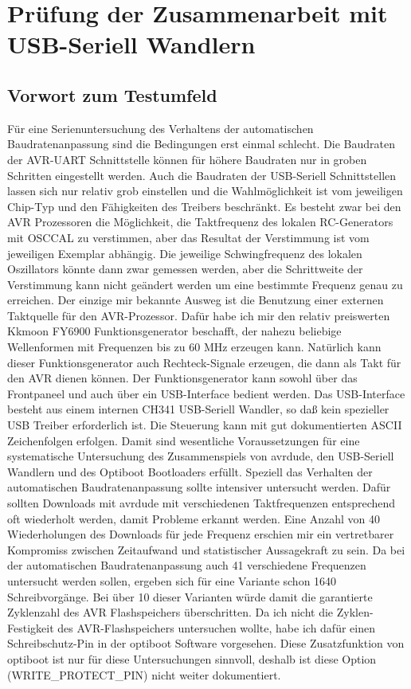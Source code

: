 \section{Prüfung der Zusammenarbeit mit USB-Seriell Wandlern}

\subsection{Vorwort zum Testumfeld}
Für eine Serienuntersuchung des Verhaltens der automatischen Baudratenanpassung sind die Bedingungen
erst einmal schlecht. Die Baudraten der AVR-UART Schnittstelle können für höhere Baudraten nur in groben
Schritten eingestellt werden. Auch die Baudraten der USB-Seriell Schnittstellen lassen sich nur
relativ grob einstellen und die Wahlmöglichkeit ist vom jeweiligen Chip-Typ und den Fähigkeiten des
Treibers beschränkt. Es besteht zwar bei den AVR Prozessoren die Möglichkeit, die Taktfrequenz des
lokalen RC-Generators mit OSCCAL zu verstimmen,
aber das Resultat der Verstimmung ist vom jeweiligen Exemplar abhängig.
Die jeweilige Schwingfrequenz des lokalen Oszillators könnte dann zwar gemessen werden, aber die
Schrittweite der Verstimmung kann nicht geändert werden um eine bestimmte Frequenz genau zu erreichen.
Der einzige mir bekannte Ausweg ist die Benutzung einer externen Taktquelle für den AVR-Prozessor.
Dafür habe ich mir den relativ preiswerten Kkmoon FY6900 Funktionsgenerator beschafft, der nahezu 
beliebige Wellenformen mit Frequenzen bis zu 60 MHz erzeugen kann. Natürlich kann dieser
Funktionsgenerator auch Rechteck-Signale erzeugen, die dann als Takt für den AVR dienen können.
Der Funktionsgenerator kann sowohl über das Frontpaneel und auch über ein USB-Interface bedient werden.
Das USB-Interface besteht aus einem internen CH341 USB-Seriell Wandler, so daß kein spezieller
USB Treiber erforderlich ist. Die Steuerung kann mit gut dokumentierten ASCII Zeichenfolgen erfolgen.
Damit sind wesentliche Voraussetzungen für eine systematische Untersuchung des Zusammenspiels
von avrdude, den USB-Seriell Wandlern und des Optiboot Bootloaders erfüllt.
Speziell das Verhalten der automatischen Baudratenanpassung sollte intensiver untersucht werden.
Dafür sollten Downloads mit avrdude mit verschiedenen Taktfrequenzen entsprechend oft wiederholt
werden, damit Probleme erkannt werden. 
Eine Anzahl von 40 Wiederholungen des Downloads für jede Frequenz erschien mir ein vertretbarer
Kompromiss zwischen Zeitaufwand und statistischer Aussagekraft zu sein.
Da bei der automatischen Baudratenanpassung auch 41 verschiedene Frequenzen untersucht werden
sollen, ergeben sich für eine Variante schon 1640 Schreibvorgänge. Bei über 10 dieser Varianten
würde damit die garantierte Zyklenzahl des AVR Flashspeichers überschritten.
Da ich nicht die Zyklen-Festigkeit des AVR-Flashspeichers untersuchen wollte, habe ich dafür einen
Schreibschutz-Pin in der optiboot Software vorgesehen. Diese Zusatzfunktion von optiboot
ist nur für diese Untersuchungen sinnvoll, deshalb ist diese Option (WRITE\_PROTECT\_PIN) nicht
weiter dokumentiert.

